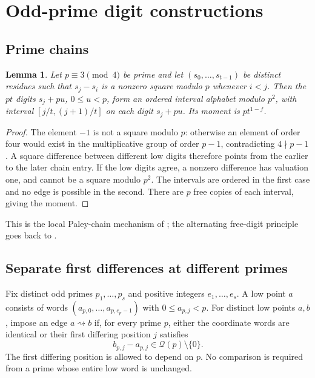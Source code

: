 \documentclass[11pt]{article}
\newtheorem{lemma}[theorem]{Lemma}
\theoremstyle{definition}
\theoremstyle{remark}
\newcommand{\QR}{\mathcal Q}
\begin{document}
\section{Odd-prime digit constructions}\label{sec:odd}
\subsection{Prime chains}
\begin{lemma}\label{lem:chain}
Let $p\equiv3\pmod4$ be prime and let $(s_0,\ldots,s_{t-1})$ be distinct
residues such that $s_j-s_i$ is a nonzero square modulo $p$ whenever $i<j$.
Then the $pt$ digits $s_j+pu$, $0\le u<p$, form an ordered interval
alphabet modulo $p^2$, with interval $[j/t,(j+1)/t]$ on each digit
$s_j+pu$. Its moment is $pt^{1-f}$.
\end{lemma}
\begin{proof}
The element $-1$ is not a square modulo $p$: otherwise an element of order
four would exist in the multiplicative group of order $p-1$, contradicting
$4\nmid p-1$. A square difference between different low digits therefore
points from the earlier to the later chain entry. If the low digits agree,
a nonzero difference has valuation one, and cannot be a square modulo $p^2$.
The intervals are ordered in the first case and no edge is possible in the
second. There are $p$ free copies of each interval, giving the moment.
\end{proof}
This is the local Paley-chain mechanism of \cite{Krachun2026}; the
alternating free-digit principle goes back to \cite{Ruzsa1984}.

\subsection{Separate first differences at different primes}
Fix distinct odd primes $p_1,\ldots,p_s$ and positive integers
$e_1,\ldots,e_s$. A low point $a$ consists of words
$(a_{p,0},\ldots,a_{p,e_p-1})$ with $0\le a_{p,j}<p$.
For distinct low points $a,b$, impose an edge $a\rightsquigarrow b$ if,
for every prime $p$, either the coordinate words are identical or their
first differing position $j$ satisfies
\begin{equation}\label{eq:lowedge}
 b_{p,j}-a_{p,j}\in\QR(p)\setminus\{0\}.
\end{equation}
The first differing position is allowed to depend on $p$. No comparison is
required from a prime whose entire low word is unchanged.
\end{document}

